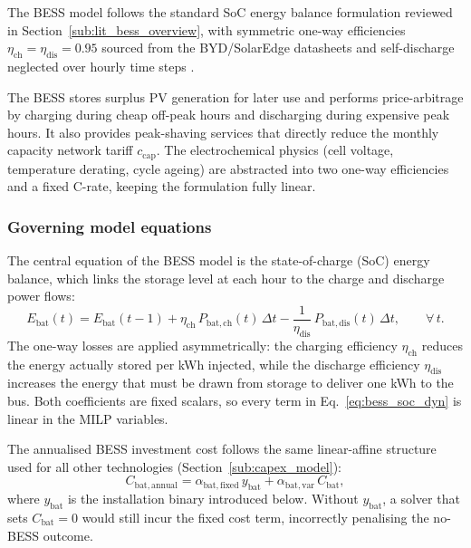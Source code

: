 \documentclass[11pt,a4paper]{report}
\begin{document}
The BESS model follows the standard SoC energy balance formulation reviewed in Section~\ref{sub:lit_bess_overview}, with symmetric one-way efficiencies $\eta_\mathrm{ch} = \eta_\mathrm{dis} = 0.95$ sourced from the BYD/SolarEdge datasheets and self-discharge neglected over hourly time steps \cite{Gabrielli2018Electrochemical}.

The BESS stores surplus PV generation for later use and performs price-arbitrage by
charging during cheap off-peak hours and discharging during expensive peak hours.
It also provides peak-shaving services that directly reduce the monthly capacity
network tariff $c_\mathrm{cap}$.
The electrochemical physics (cell voltage, temperature derating, cycle ageing) are
abstracted into two one-way efficiencies and a fixed C-rate, keeping the formulation
fully linear.

\subsubsection{Governing model equations}
\label{sub:bess_equations}

The central equation of the BESS model is the state-of-charge (SoC) energy
balance, which links the storage level at each hour to the charge and discharge
power flows:
\begin{equation}
    E_\mathrm{bat}(t) = E_\mathrm{bat}(t-1)
        + \eta_\mathrm{ch}\,P_\mathrm{bat,ch}(t)\,\Delta t
        - \frac{1}{\eta_\mathrm{dis}}\,P_\mathrm{bat,dis}(t)\,\Delta t,
    \qquad \forall\,t.
    \label{eq:bess_soc_dyn}
\end{equation}
The one-way losses are applied asymmetrically: the charging efficiency
$\eta_\mathrm{ch}$ reduces the energy actually stored per kWh injected, while
the discharge efficiency $\eta_\mathrm{dis}$ increases the energy that must be
drawn from storage to deliver one kWh to the bus.
Both coefficients are fixed scalars, so every term in
Eq.~\eqref{eq:bess_soc_dyn} is linear in the MILP variables.

The annualised BESS investment cost follows the same linear-affine structure
used for all other technologies (Section~\ref{sub:capex_model}):
\begin{equation}
    C_\mathrm{bat,annual}
        = \alpha_\mathrm{bat,fixed}\,y_\mathrm{bat}
        + \alpha_\mathrm{bat,var}\,C_\mathrm{bat},
    \label{eq:bess_capex}
\end{equation}
where $y_\mathrm{bat}$ is the installation binary introduced below.
Without $y_\mathrm{bat}$, a solver that sets $C_\mathrm{bat} = 0$ would still
incur the fixed cost term, incorrectly penalising the no-BESS outcome.
\end{document}
